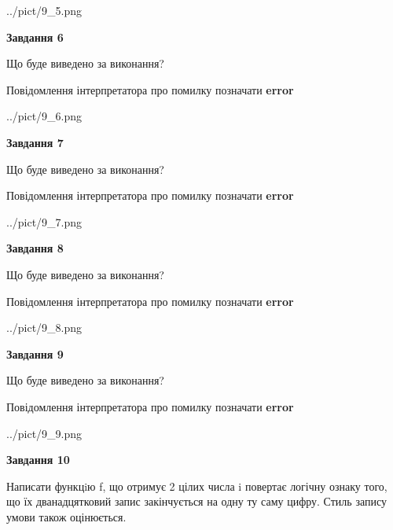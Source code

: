 \documentclass[12pt, ukrainian]{article}
\begin{document}
{\begin {large}
\begin{center}
	{../pict/9_5.png}
\end{center}
\newpage

{\begin {center}\textbf{Завдання 6}\end {center}}\par
Що буде виведено за виконання? \par
Повідомлення інтерпретатора про помилку позначати \textbf{error}

\begin{center}
	{../pict/9_6.png}
\end{center}
\newpage

{\begin {center}\textbf{Завдання 7}\end {center}}\par
Що буде виведено за виконання? \par
Повідомлення інтерпретатора про помилку позначати \textbf{error}

\begin{center}
	{../pict/9_7.png}
\end{center}
\newpage

{\begin {center}\textbf{Завдання 8}\end {center}}\par
Що буде виведено за виконання? \par
Повідомлення інтерпретатора про помилку позначати \textbf{error}

\begin{center}
	{../pict/9_8.png}
\end{center}
\newpage

{\begin {center}\textbf{Завдання 9}\end {center}}\par
Що буде виведено за виконання? \par
Повідомлення інтерпретатора про помилку позначати \textbf{error}

\begin{center}
	{../pict/9_9.png}
\end{center}
\newpage

{\begin {center}\textbf{Завдання 10}\end {center}}\par

Написати функцiю f, що отримує 2 цілих числа i повертає логічну ознаку того, що їх дванадцятковий запис закінчується на одну ту саму цифру. Стиль запису умови також оцінюється.\par
\newpage

\end {large}}
\end{document}
